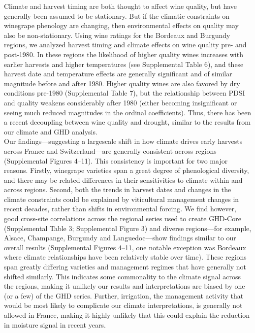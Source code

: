 \documentclass[final]{nature}
\begin{document}
\indent Climate and harvest timing are both thought to affect wine quality, but have generally been assumed to be stationary. But if the climatic constraints on winegrape phenology are changing, then environmental effects on quality may also be non-stationary. Using wine ratings for the Bordeaux and Burgundy regions\cite{Broadbent2002}, we analyzed harvest timing and climate effects on wine quality pre- and post-1980. In these regions the likelihood of higher quality wines increases with earlier harvests and higher temperatures (see Supplemental Table 6), and these harvest date and temperature effects are generally significant and of similar magnitude before and after 1980. Higher quality wines are also favored by dry conditions pre-1980 (Supplemental Table 7), but the relationship between PDSI and quality weakens considerably after 1980 (either becoming insignificant or seeing much reduced magnitudes in the ordinal coefficients). Thus, there has been a recent decoupling between wine quality and drought, similar to the results from our climate and GHD analysis.\\
\indent Our findings---suggesting a largescale shift in how climate drives early harvests across France and Switzerland---are generally consistent across regions (Supplemental Figures 4--11).  This consistency is important for two major reasons. Firstly, winegrape varieties span a great degree of phenological diversity, and there may be related differences in their sensitivities to climate within and across regions\cite{Parker2013}. Second, both the trends in harvest dates and changes in the climate constraints could be explained by viticultural management changes in recent decades, rather than shifts in environmental forcing. We find however, good cross-site correlations across the regional series used to create GHD-Core (Supplemental Table 3; Supplemental Figure 3) and diverse regions---for example, Alsace, Champange, Burgundy and Languedoc---show findings similar to our overall results (Supplemental Figures 4--11, one notable exception was Bordeaux where climate relationships have been relatively stable over time). These regions span greatly differing varieties and management regimes that have generally not shifted similarly. This indicates some commonality to the climate signal across the regions, making it unlikely our results and interpretations are biased by one (or a few) of the GHD series. Further, irrigation, the management activity that would be most likely to complicate our climate interpretations, is generally not allowed in France, making it highly unlikely that this could explain the reduction in moisture signal in recent years.\\
\end{document}
